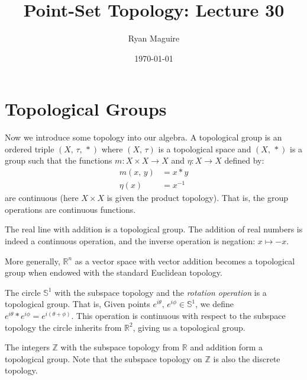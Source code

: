 \documentclass{article}
\title{Point-Set Topology: Lecture 30}
\author{Ryan Maguire}
\date{\today}
\theoremstyle{plain}
\theoremstyle{normal}
\newenvironment{example}{%
    \pushQED{\qed}\renewcommand{\qedsymbol}{$\blacksquare$}\examplex%
}{%
    \popQED\endexamplex%
}
\newenvironment{definition}{%
    \pushQED{\qed}\renewcommand{\qedsymbol}{$\blacksquare$}\definitionx%
}{%
    \popQED\enddefinitionx%
}
\begin{document}
    \maketitle
    \section{Topological Groups}
        Now we introduce some topology into our algebra.
        \begin{definition}[\textbf{Topological Group}]
            A topological group is an ordered triple $(X,\,\tau,\,*)$ where
            $(X,\,\tau)$ is a topological space and $(X,\,*)$ is a group
            such that the functions $m:X\times{X}\rightarrow{X}$ and
            $\eta:X\rightarrow{X}$ defined by:
            \begin{align}
                m(x,\,y)&=x*y\\
                \eta(x)&=x^{-1}
            \end{align}
            are continuous (here $X\times{X}$ is given the product topology).
            That is, the group operations are continuous functions.
        \end{definition}
        \begin{example}
            The real line with addition is a topological group. The addition
            of real numbers is indeed a continuous operation, and the inverse
            operation is negation: $x\mapsto{-x}$.
        \end{example}
        \begin{example}
            More generally, $\mathbb{R}^{n}$ as a vector space with vector
            addition becomes a topological group when endowed with the standard
            Euclidean topology.
        \end{example}
        \begin{example}
            The circle $\mathbb{S}^{1}$ with the subspace topology and the
            \textit{rotation operation} is a topological group. That is,
            Given points $e^{i\theta},\,e^{i\phi}\in\mathbb{S}^{1}$, we define
            $e^{i\theta}*e^{i\phi}=e^{i(\theta+\phi)}$. This operation is
            continuous with respect to the subspace topology the circle
            inherits from $\mathbb{R}^{2}$, giving us a topological group.
        \end{example}
        \begin{example}
            The integers $\mathbb{Z}$ with the subspace topology from
            $\mathbb{R}$ and addition form a topological group. Note that the
            subspace topology on $\mathbb{Z}$ is also the discrete topology.
        \end{example}
\end{document}
